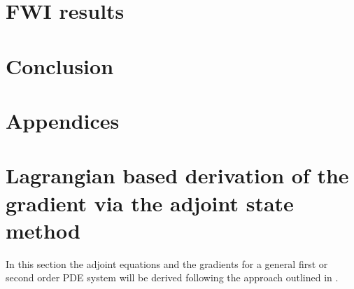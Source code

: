 \documentclass[fleqn,11pt]{SelfArx} %
\theoremstyle{definition}
\begin{document}
\section{FWI results}


\section{Conclusion}







\appendix
\section*{Appendices}
\section{Lagrangian based derivation of the gradient via the adjoint state method}\label{sec:general_math}
In this section the adjoint equations and the gradients for a general first or second order PDE system will be derived following the approach outlined in \cite{Bradley2012}.
\end{document}
